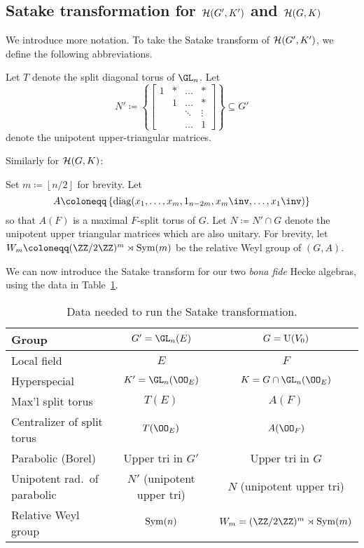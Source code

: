 \subsection{Satake transformation for $\mathcal H(G',K')$ and $\mathcal H(G,K)$}
We introduce more notation.
To take the Satake transform of $\mathcal H(G', K')$, we define the following abbreviations.
\begin{itemize}
  \ii Let $T$ denote the split diagonal torus of $\GL_n$.
  \ii Let
  \[ N' \coloneqq \left\{ \begin{bmatrix}
      1 & \ast & \dots & \ast \\
        & 1 & \dots & \ast \\
        &   & \ddots & \vdots \\
        &   & \dots & 1 \end{bmatrix}\right\} \subseteq G' \]
  denote the unipotent upper-triangular matrices.
\end{itemize}
Similarly for $\mathcal H(G, K)$:
\begin{itemize}
  \ii Set $m \coloneqq \left\lfloor n/2 \right\rfloor$ for brevity.
  \ii Let
  \[ A \coloneqq \left\{
    \diag(x_1, \dots, x_m, 1_{n-2m}, x_m\inv, \dots, x_1\inv) \right\} \]
  so that $A(F)$ is a maximal $F$-split torus of $G$.
  \ii Let $N \coloneqq N' \cap G$ denote the unipotent upper triangular matrices
  which are also unitary.
  \ii For brevity, let $W_m \coloneqq (\ZZ/2\ZZ)^m \rtimes \Sym(m)$
  be the relative Weyl group of $(G,A)$.
\end{itemize}

We can now introduce the Satake transform for our two
\emph{bona fide} Hecke algebras, using the data in Table~\ref{tab:satakestuff}.

\begin{table}
  \centering
  \begin{tabular}{lcc}
    Group & $G' = \GL_n(E)$ & $G = \operatorname{U}(V_0)$ \\ \hline
    Local field & $E$ & $F$ \\
    Hyperspecial & $K' = \GL_n(\OO_E)$ & $K = G \cap \GL_n(\OO_E)$ \\
    Max'l split torus & $T(E)$ & $A(F)$ \\
    Centralizer of split torus & $T(\OO_E)$ & $A(\OO_F)$ \\
    Parabolic (Borel) & Upper tri in $G'$ & Upper tri in $G$ \\
    Unipotent rad.\ of parabolic & $N'$ (unipotent upper tri) & $N$ (unipotent upper tri)  \\
    Relative Weyl group & $\operatorname{Sym}(n)$ & $W_m = (\ZZ/2\ZZ)^m \rtimes \Sym(m)$ \\
  \end{tabular}
  \caption{Data needed to run the Satake transformation.}
  \label{tab:satakestuff}
\end{table}

